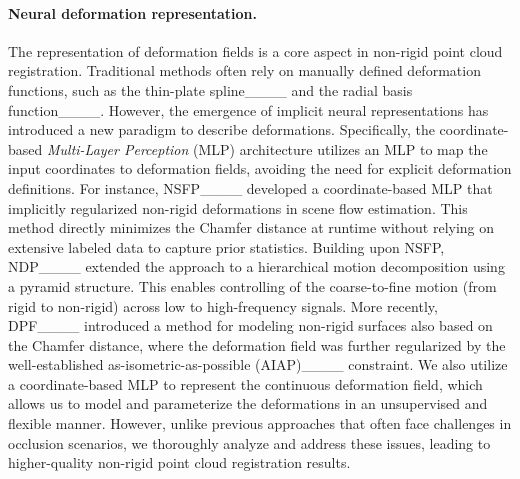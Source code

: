 \paragraph{Neural deformation representation.}  The representation of deformation fields is a core aspect in non-rigid point cloud registration. Traditional methods often rely on manually defined deformation functions, such as the thin-plate spline____ and the radial basis function____. However, the emergence of implicit neural representations has introduced a new paradigm to describe deformations. Specifically, the coordinate-based \emph{Multi-Layer Perception} (MLP) architecture utilizes an MLP to map the input coordinates to deformation fields, avoiding the need for explicit deformation definitions. For instance, NSFP____ developed a coordinate-based MLP that implicitly regularized non-rigid deformations in scene flow estimation. This method directly minimizes the Chamfer distance at runtime without relying on extensive labeled data to capture prior statistics. Building upon NSFP, NDP____ extended the approach to a hierarchical motion decomposition using a pyramid structure. This enables controlling of the coarse-to-fine motion (from rigid to non-rigid) across low to high-frequency signals. More recently, DPF____ introduced a method for modeling non-rigid surfaces also based on the Chamfer distance, where the deformation field was further regularized by the well-established as-isometric-as-possible (AIAP)____ constraint. %
We also utilize a coordinate-based MLP to represent the continuous deformation field, which allows us to model and parameterize the deformations in an unsupervised and flexible manner. However, unlike previous approaches that often face challenges in occlusion scenarios, we thoroughly analyze and address these issues, leading to higher-quality non-rigid point cloud registration results.
